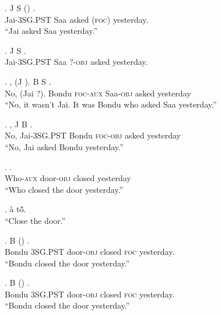 \documentclass{assets/fieldnotes}
\begin{document}
\exg. J S  () .\\
Jai-\textsc{3SG.PST} Saa asked (\textsc{foc}) yesterday.\\
``Jai asked Saa yesterday.''

\exg. J S   .\\
Jai-\textsc{3SG.PST} Saa \textsc{?-obj} asked yesterday.\\

\exg. , (J ). B  S  .\\
No, (Jai ?). Bondu \textsc{foc-aux} Saa-\textsc{obj} asked yesterday\\
``No, it wasn't Jai. It was Bondu who asked Saa yesterday.''

\exg. , J B   .\\
No, Jai-\textsc{3SG.PST} Bondu \textsc{foc-obj} asked yesterday\\
``No, Jai asked Bondu yesterday.''  

\exg.    .\\
Who-\textsc{aux} door-\textsc{obj} closed yesterday\\
``Who closed the door yesterday.''

\ex. \`a t\'{\~o}.\\
``Close the door.''

\exg. B    () .\\
Bondu \textsc{3SG.PST} door-\textsc{obj} closed \textsc{foc} yesterday.\\
``Bondu closed the door yesterday.''

\exg. B    () .\\
Bondu \textsc{3SG.PST} door-\textsc{obj} closed \textsc{foc} yesterday.\\
``Bondu closed the door yesterday.''\\
\end{document}

